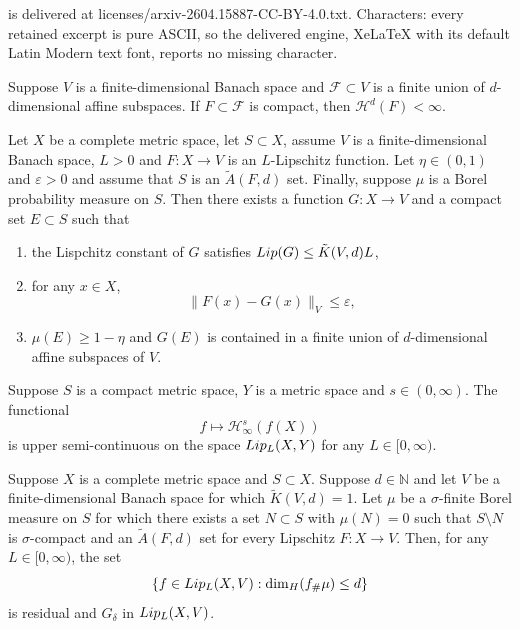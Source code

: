 \documentclass[10pt,a4paper]{amsart}
\def\H{\mathcal{H}}
\def\nat{\mathbb{N}}
\newcommand{\tLip}{\textnormal{Lip}}
\begin{document}
is delivered at licenses/arxiv-2604.15887-CC-BY-4.0.txt. Characters: every retained excerpt is pure ASCII, so the delivered engine, XeLaTeX with its default Latin Modern text font, reports no missing character.
\begin{observation}\label{O:finiteness-subspaces}
    Suppose $V$ is a finite-dimensional Banach space and $\mathcal{F}\subset V$ is a finite union of $d$-dimensional affine subspaces. If $F\subset \mathcal{F}$ is compact, then $\H^d(F)<\infty$.
\end{observation}

\begin{theorem}\label{T:StV-main}
    Let $X$ be a complete metric space, let $S\subset X$, assume $V$ is a finite-dimensional Banach space, $L>0$ and $F\colon X \to V$ is an $L$-Lipschitz function. Let $\eta\in (0,1)$ and $\varepsilon>0$ and assume that $S$ is an $\tilde{A}(F,d)$ set. Finally, suppose $\mu$ is a Borel probability measure on $S$. Then there exists a function $G\colon X \to V$ and a compact set $E\subset S$ such that
    \begin{enumerate}
        \item\label{Enum:StV-main-1} the Lispchitz constant of $G$ satisfies $\tLip(G)\leq \tilde{K}(V,d) L$,
        \item\label{Enum:StV-main-2} for any $x\in X$,
        \begin{equation*}
            \lVert F(x) -G(x)\rVert_{V}\leq \varepsilon,
        \end{equation*}
        \item\label{Enum:StV-main-3} $\mu(E)\geq 1-\eta$ and $G(E)$ is contained in a finite union of $d$-dimensional affine subspaces of $V$.
    \end{enumerate}
\end{theorem}

\begin{lemma}\label{L:semicont}
    Suppose $S$ is a compact metric space, $Y$ is a metric space and $s\in (0,\infty)$. The functional
    \begin{equation*}
        f\mapsto \H^s_\infty(f(X))
    \end{equation*}
    is upper semi-continuous on the space $\tLip_L(X,Y)$ for any $L\in [0,\infty)$.
\end{lemma}

\begin{theorem}
    Suppose $X$ is a complete metric space and $S\subset X$.
    Suppose $d\in \nat$ and let $V$ be a finite-dimensional Banach space for which $\tilde{K}(V,d)=1$.
    Let $\mu$ be a $\sigma$-finite Borel measure on $S$ for which there exists a set $N\subset S$ with $\mu(N)=0$ such that $S\setminus N$ is $\sigma$-compact and an $\tilde{A}(F,d)$ set for every Lipschitz $F\colon X\to V$.
    Then, for any $L\in [0,\infty)$, the set
    \begin{equation*}
        \{f\in \tLip_L(X,V): \dim_H(f_\# \mu)\leq d\}
    \end{equation*}
    is residual and $G_\delta$ in $\tLip_L(X,V)$.
\end{theorem}
\end{document}
